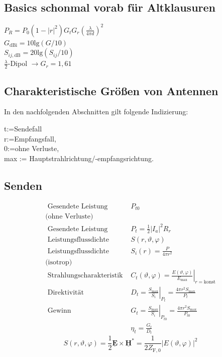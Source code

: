 \documentclass[english]{latex4ei/latex4ei_sheet}
\renewcommand{\vec}[1]{\underline{\boldsymbol{#1}}}
\begin{document}
\begin{sectionbox}

\subsection{Basics schonmal vorab für Altklausuren}
$P_R = P_0 (1 - |r|^2)G_tG_r\left(\frac{\lambda}{4\pi d}\right)^2$\\
$G_{\text{dBi}} = 10\text{lg}(G / 10)$\\
$S_{ij, \text{dB}} = 20\text{lg}(S_{ij} / 10)$\\
$\frac{\lambda}{2}$-Dipol $\rightarrow G_{r} = 1,61$
\end{sectionbox}
\begin{sectionbox}
\begin{sectionbox}
\subsection{Charakteristische Größen von Antennen}
In den nachfolgenden Abschnitten gilt folgende Indizierung:\\
\begin{emphbox}
\begin{flushleft}
t:=Sendefall \\
r:=Empfangsfall,\\
0:=ohne Verluste,\\
max := Hauptstrahlrichtung/-empfangsrichtung.
\end{flushleft}

\end{emphbox}
\end{sectionbox}
\subsection{Senden}
$$
\begin{array}{ll}	

	\text { Gesendete Leistung } & P_{t 0} \\
	\text{(ohne Verluste)}&\\
	\text { Gesendete Leistung } & P_{t}=\frac{1}{2}\left\lvert I_a\right\rvert^2 R_r  \\
	\text { Leistungsflussdichte } 	& S(r, \vartheta, \varphi) \\
	\text { Leistungsflussdichte}& S_{i}(r)=\frac{P}{4 \pi r^{2}} \\
	\text{(isotrop) }	&\\
	\text { Strahlungscharakteristik }  & C_{t}(\vartheta, \varphi)=\left.\frac{E(\vartheta, \varphi)}{E_{\max }}\right|_{r=\mathrm{konst}} \\
	\text { Direktivität } & D_{t}=\left.\frac{S_{\max }}{S_{i}}\right|_{P_{t}}=\frac{4 \pi r^{2} S_{\max }}{P_{t}} \\
	\text { Gewinn } & G_{t}=\left.\frac{S_{\max }}{S_{i}}\right|_{P_{t 0}}=\frac{4 \pi r^{2} S_{\max }}{P_{t 0}} \\
	& \eta_{t}=\frac{G_{t}}{D_{t}}
\end{array}
$$
$$
	S(r, \vartheta, \varphi) =\frac{1}{2} \vec{E} \times \vec{H}^{*} =\frac{1}{2 Z_{\mathrm{F}, 0}}|E(\vartheta, \varphi)|^{2} 
$$
\end{sectionbox}
\end{document}
